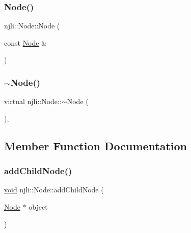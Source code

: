 \subsubsection{\texorpdfstring{Node()}{Node()}\hspace{0.1cm}{\footnotesize\ttfamily [3/3]}}
{\footnotesize\ttfamily njli\+::\+Node\+::\+Node (\begin{DoxyParamCaption}\item[{const \mbox{\hyperlink{classnjli_1_1_node}{Node}} \&}]{ }\end{DoxyParamCaption})\hspace{0.3cm}{\ttfamily [protected]}}

\mbox{\label{classnjli_1_1_node_a256fc357da68d049b40baa98b00dfcec}} 
\subsubsection{\texorpdfstring{$\sim$\+Node()}{~Node()}}
{\footnotesize\ttfamily virtual njli\+::\+Node\+::$\sim$\+Node (\begin{DoxyParamCaption}{ }\end{DoxyParamCaption})\hspace{0.3cm}{\ttfamily [protected]}, {\ttfamily [virtual]}}



\subsection{Member Function Documentation}
\mbox{\label{classnjli_1_1_node_a616d8f89896918a2bc402f3c0d06aecd}} 
\subsubsection{\texorpdfstring{add\+Child\+Node()}{addChildNode()}}
{\footnotesize\ttfamily \mbox{\hyperlink{_thread_8h_af1e856da2e658414cb2456cb6f7ebc66}{void}} njli\+::\+Node\+::add\+Child\+Node (\begin{DoxyParamCaption}\item[{\mbox{\hyperlink{classnjli_1_1_node}{Node}} $\ast$}]{object }\end{DoxyParamCaption})}




